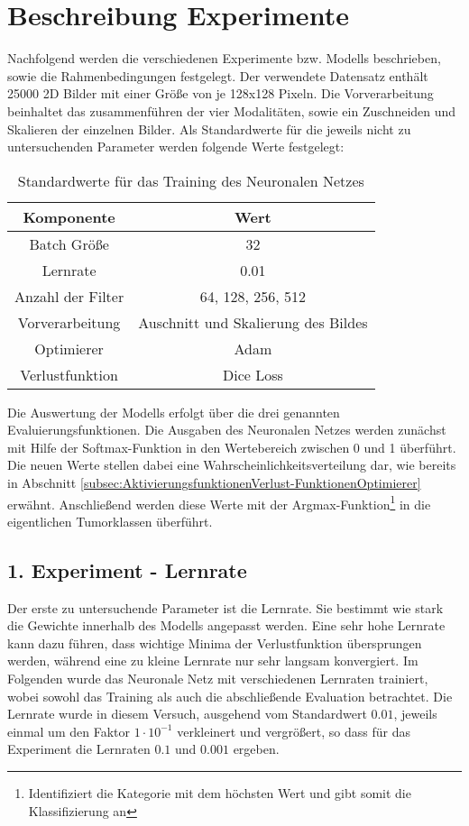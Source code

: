 \section{Beschreibung Experimente}
Nachfolgend werden die verschiedenen Experimente bzw. \glspl{Modell} beschrieben, sowie die Rahmenbedingungen festgelegt. Der verwendete Datensatz enthält 25000 2D Bilder mit einer Größe von je 128x128 Pixeln. Die Vorverarbeitung beinhaltet das zusammenführen der vier Modalitäten, sowie ein Zuschneiden und Skalieren der einzelnen Bilder. Als Standardwerte für die jeweils nicht zu untersuchenden Parameter werden folgende Werte festgelegt:
\begin{table}[h!]
\begin{longtable}{|c|c|}
	\hline
		\multicolumn{1}{|c|}{\textbf{Komponente}} & \multicolumn{1}{c|}{\textbf{Wert}} \\
		\endhead
	\hline
		Batch Größe & 32 \\
	\hline
		Lernrate & 0.01 \\
	\hline
		Anzahl der Filter & 64, 128, 256, 512 \\
	\hline
		Vorverarbeitung & Auschnitt und Skalierung des Bildes \\
	\hline
		Optimierer & Adam \\
	\hline
		Verlustfunktion & Dice Loss \\
	\hline
\end{longtable}
\caption{Standardwerte für das Training des Neuronalen Netzes}
\end{table}
Die Auswertung der \glspl{Modell} erfolgt über die drei genannten Evaluierungsfunktionen. Die Ausgaben des Neuronalen Netzes werden zunächst mit Hilfe der Softmax-Funktion in den Wertebereich zwischen 0 und 1 überführt. Die neuen Werte stellen dabei eine Wahrscheinlichkeitsverteilung dar, wie bereits in Abschnitt \ref{subsec:AktivierungsfunktionenVerlust-FunktionenOptimierer} erwähnt. Anschließend werden diese Werte mit der Argmax-Funktion\footnote{Identifiziert die Kategorie mit dem höchsten Wert und gibt somit die Klassifizierung an} in die eigentlichen Tumorklassen überführt.

\subsection{1. Experiment - Lernrate}
Der erste zu untersuchende Parameter ist die Lernrate. Sie bestimmt wie stark die Gewichte innerhalb des \gls{Modell}s angepasst werden. Eine sehr hohe Lernrate kann dazu führen, dass wichtige Minima der Verlustfunktion übersprungen werden, während eine zu kleine Lernrate nur sehr langsam konvergiert. Im Folgenden wurde das Neuronale Netz mit verschiedenen Lernraten trainiert, wobei sowohl das Training als auch die abschließende Evaluation betrachtet. Die Lernrate wurde in diesem Versuch, ausgehend vom Standardwert $0.01$, jeweils einmal um den Faktor $1\cdot 10^{-1}$ verkleinert und vergrößert, so dass für das Experiment die Lernraten $0.1$ und $0.001$ ergeben.

